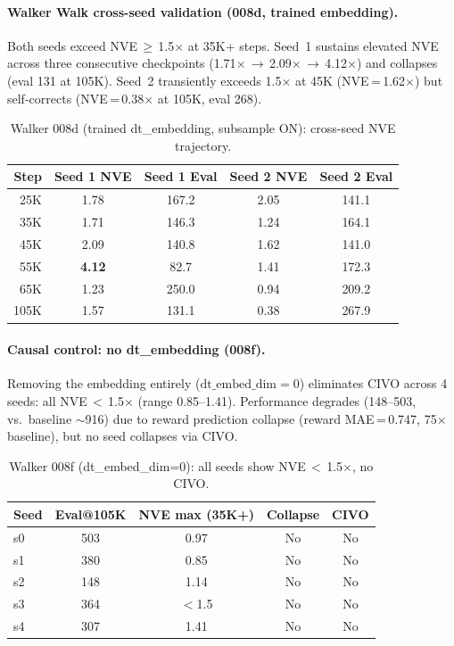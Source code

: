 \documentclass[10pt,letterpaper]{article}
\begin{document}
\paragraph{Walker Walk cross-seed validation (008d, trained embedding).}
Both seeds exceed NVE\,$\geq$\,1.5$\times$ at 35K+ steps.
Seed~1 sustains elevated NVE across three consecutive checkpoints (1.71$\times$\,$\to$\,2.09$\times$\,$\to$\,4.12$\times$) and collapses (eval 131 at 105K).
Seed~2 transiently exceeds 1.5$\times$ at 45K (NVE\,=\,1.62$\times$) but self-corrects (NVE\,=\,0.38$\times$ at 105K, eval 268).

\begin{table}[h]
\centering
\caption{Walker 008d (trained dt\_embedding, subsample ON): cross-seed NVE trajectory.}
\label{tab:008d_cross_seed}
\small
\begin{tabular}{@{}rcccc@{}}
\toprule
Step & Seed 1 NVE & Seed 1 Eval & Seed 2 NVE & Seed 2 Eval \\
\midrule
25K  & 1.78 & 167.2 & 2.05 & 141.1 \\
35K  & 1.71 & 146.3 & 1.24 & 164.1 \\
45K  & 2.09 & 140.8 & 1.62 & 141.0 \\
55K  & \textbf{4.12} & 82.7  & 1.41 & 172.3 \\
65K  & 1.23 & 250.0 & 0.94 & 209.2 \\
105K & 1.57 & 131.1 & 0.38 & 267.9 \\
\bottomrule
\end{tabular}
\end{table}

\paragraph{Causal control: no dt\_embedding (008f).}
Removing the embedding entirely ($\text{dt\_embed\_dim}=0$) eliminates CIVO across 4 seeds: all NVE\,$<$\,1.5$\times$ (range 0.85--1.41).
Performance degrades (148--503, vs.\ baseline $\sim$916) due to reward prediction collapse (reward MAE\,=\,0.747, 75$\times$ baseline), but no seed collapses via CIVO.

\begin{table}[h]
\centering
\caption{Walker 008f (dt\_embed\_dim=0): all seeds show NVE\,$<$\,1.5$\times$, no CIVO.}
\label{tab:008f}
\small
\begin{tabular}{@{}lcccc@{}}
\toprule
Seed & Eval@105K & NVE max (35K+) & Collapse & CIVO \\
\midrule
s0 & 503 & 0.97 & No & No \\
s1 & 380 & 0.85 & No & No \\
s2 & 148 & 1.14 & No & No \\
s3 & 364 & $<$1.5 & No & No \\
s4 & 307 & 1.41 & No & No \\
\bottomrule
\end{tabular}
\end{table}
\end{document}
